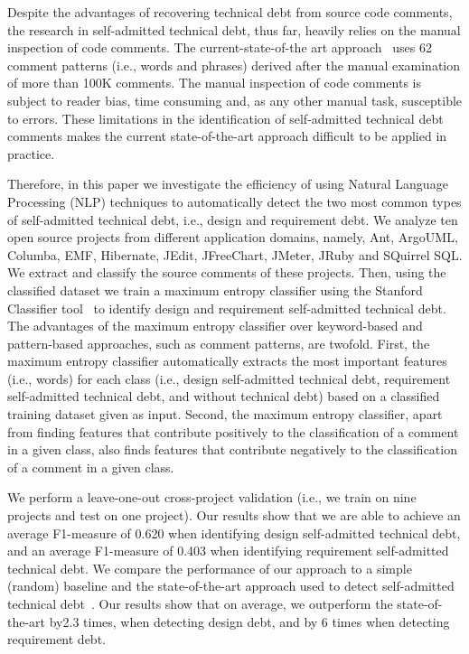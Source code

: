 \documentclass[10pt,journal,compsoc]{IEEEtran}
\newcommand{\SATD}{self-admitted technical debt\xspace}
\newcommand{\revised}[2]{{#1}}
\begin{document}
Despite the advantages of recovering technical debt from source code comments, the research in \SATD, thus far, heavily relies on the manual inspection of code comments. The current-state-of-the art approach~\cite{Potdar2014ICSME} uses 62 comment patterns (i.e., words and phrases) derived after the manual examination of more than 100K comments. The manual inspection of code comments is subject to reader bias, time consuming and, as any other manual task, susceptible to errors. These limitations in the identification of \SATD comments makes the current state-of-the-art approach difficult to be applied in practice.

Therefore, in this paper we investigate the efficiency of using Natural Language Processing (NLP) techniques to automatically detect the two most common types of \SATD, i.e., design and requirement debt. We analyze ten open source projects from different application domains, namely, Ant, ArgoUML, Columba, EMF, Hibernate, JEdit, JFreeChart, JMeter, JRuby and SQuirrel SQL. We extract and classify the source comments of these projects. Then, using the classified dataset we train a \revised{maximum entropy classifier using the Stanford Classifier tool}{R2-11}~\cite{manning2003optimization} to identify design and requirement \SATD.
The advantages of the \revised{maximum entropy classifier}{R2-11} over keyword-based and pattern-based approaches, such as comment patterns, are twofold. First, the \revised{maximum entropy classifier}{R2-11} automatically extracts the most important features (i.e., words) for each class (i.e., design \SATD, requirement \SATD, and without technical debt) based on a classified training dataset given as input. Second, the \revised{maximum entropy classifier}{R2-11}, apart from finding features that contribute positively to the classification of a comment in a given class, also finds features that contribute negatively to the classification of a comment in a given class.

We perform a leave-one-out cross-project validation (i.e., we train on nine projects and test on one project). Our results show that we are able to  achieve an average F1-measure of 0.620 when identifying design \SATD, and an average F1-measure of 0.403 when identifying requirement \SATD. We compare the performance of our approach to a simple (random) baseline and the state-of-the-art approach used to detect \SATD~\cite{Potdar2014ICSME}. Our results show that on average, we outperform the state-of-the-art by\revised{2.3 times, when detecting design debt, and by 6 times when detecting requirement debt.}{R1-8}
\end{document}
